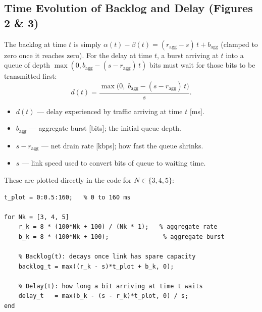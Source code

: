 \documentclass[12pt, a4paper]{article}
\begin{document}
\subsection*{Time Evolution of Backlog and Delay (Figures 2 \& 3)}

The backlog at time $t$ is simply $\alpha(t) - \beta(t) = (r_\text{agg} - s)\,t + b_\text{agg}$
(clamped to zero once it reaches zero).
For the delay at time $t$, a burst arriving at $t$ into a queue of depth
$\max(0, b_\text{agg} - (s - r_\text{agg})\,t)$ bits must wait for those bits
to be transmitted first:
\[
  d(t) = \frac{\max\!\bigl(0,\; b_\text{agg} - (s - r_\text{agg})\,t\bigr)}{s}.
\]
\begin{itemize}[leftmargin=1.4em, itemsep=2pt]
  \item $d(t)$ --- delay experienced by traffic arriving at time $t$ [ms].
  \item $b_\text{agg}$ --- aggregate burst [bits]; the initial queue depth.
  \item $s - r_\text{agg}$ --- net drain rate [kbps]; how fast the queue shrinks.
  \item $s$ --- link speed used to convert bits of queue to waiting time.
\end{itemize}

These are plotted directly in the code for $N \in \{3, 4, 5\}$:

\begin{lstlisting}[style=matlab]
t_plot = 0:0.5:160;   % 0 to 160 ms

for Nk = [3, 4, 5]
    r_k = 8 * (100*Nk + 100) / (Nk * 1);   % aggregate rate
    b_k = 8 * (100*Nk + 100);               % aggregate burst

    % Backlog(t): decays once link has spare capacity
    backlog_t = max((r_k - s)*t_plot + b_k, 0);

    % Delay(t): how long a bit arriving at time t waits
    delay_t   = max(b_k - (s - r_k)*t_plot, 0) / s;
end
\end{lstlisting}
\end{document}
